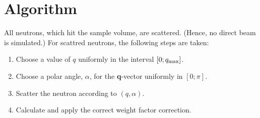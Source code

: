 \section{Algorithm}
All neutrons, which hit the sample volume, are scattered.
(Hence, no direct beam is simulated.)
For scattred neutrons, the following steps are taken:
\begin{enumerate}
\item Choose a value of $q$ uniformly in the interval $[0;q_{\rm max}]$.
\item Choose a polar angle, $\alpha$,
  for the {\bf q}-vector uniformly in $[0;\pi]$.
\item Scatter the neutron according to $(q,\alpha)$.
\item Calculate and apply the correct weight factor correction.
\end{enumerate}
